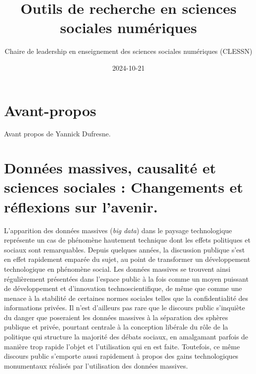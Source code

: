 \documentclass[
  letterpaper,
  DIV=11,
  numbers=noendperiod]{scrreprt}
\title{Outils de recherche en sciences sociales numériques}
\author{Chaire de leadership en enseignement des sciences sociales
numériques (CLESSN)}
\date{2024-10-21}
\renewcommand*\contentsname{Table of contents}
\newcommand\contentsname{Table of contents}
\begin{document}
\maketitle
\ifdefined\Shaded\renewenvironment{Shaded}{\begin{tcolorbox}[frame hidden, sharp corners, interior hidden, borderline west={3pt}{0pt}{shadecolor}, enhanced, boxrule=0pt, breakable]}{\end{tcolorbox}}\fi

\renewcommand*\contentsname{Table of contents}
{
\hypersetup{linkcolor=}
\setcounter{tocdepth}{2}
\tableofcontents
}

\hypertarget{avant-propos}{%
\chapter*{Avant-propos}\label{avant-propos}}


Avant propos de Yannick Dufresne.


\hypertarget{donnuxe9es-massives-causalituxe9-et-sciences-sociales-changements-et-ruxe9flexions-sur-lavenir.}{%
\chapter*{Données massives, causalité et sciences sociales : Changements
et réflexions sur
l'avenir.}\label{donnuxe9es-massives-causalituxe9-et-sciences-sociales-changements-et-ruxe9flexions-sur-lavenir.}}


L'apparition des données massives (\emph{big data}) dans le paysage
technologique représente un cas de phénomène hautement technique dont
les effets politiques et sociaux sont remarquables. Depuis quelques
années, la discussion publique s'est en effet rapidement emparée du
sujet, au point de transformer un développement technologique en
phénomène social. Les données massives se trouvent ainsi régulièrement
présentées dans l'espace public à la fois comme un moyen puissant de
développement et d'innovation technoscientifique, de même que comme une
menace à la stabilité de certaines normes sociales telles que la
confidentialité des informations privées. Il n'est d'ailleurs pas rare
que le discours public s'inquiète du danger que poseraient les données
massives à la séparation des sphères publique et privée, pourtant
centrale à la conception libérale du rôle de la politique qui structure
la majorité des débats sociaux, en amalgamant parfois de manière trop
rapide l'objet et l'utilisation qui en est faite. Toutefois, ce même
discours public s'emporte aussi rapidement à propos des gains
technologiques monumentaux réalisés par l'utilisation des données
massives.
\end{document}
